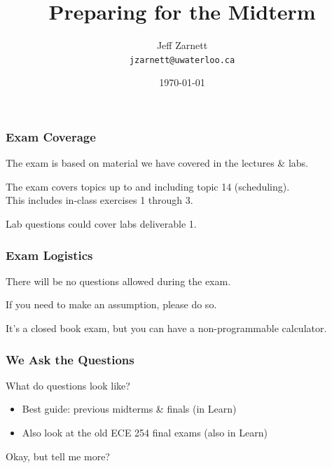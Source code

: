 

\title{ Preparing for the Midterm }

\author{Jeff Zarnett \\ \small \texttt{jzarnett@uwaterloo.ca}}
\date{\today}




\begin{frame}
  \titlepage

\end{frame}

\begin{frame}
\frametitle{Exam Coverage}

The exam is based on material we have covered in the lectures \& labs.

The exam covers topics up to and including topic 14 (scheduling).\\
\quad This includes in-class exercises 1 through 3.

Lab questions could cover labs deliverable 1.

\end{frame}

\begin{frame}
\frametitle{Exam Logistics}
There will be no questions allowed during the exam.

If you need to make an assumption, please do so. 

It's a closed book exam, but you can have a non-programmable calculator.

\end{frame}

\begin{frame}
\frametitle{We Ask the Questions}

What do questions look like?

\begin{itemize}
	\item Best guide: previous midterms \& finals (in Learn)
	\item Also look at the old ECE 254 final exams (also in Learn)
\end{itemize}

Okay, but tell me more?

\end{frame}

